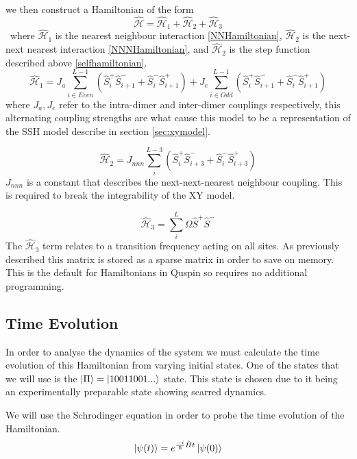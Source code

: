 we then construct a Hamiltonian of the form 
\begin{equation}
\hat{\mathcal{H}} = \hat{\mathcal{H}}_{1} + \hat{\mathcal{H}}_{2} +\hat{\mathcal{H}}_3
\end{equation}\
where $\hat{\mathcal{H}}_{1}$ is the nearest neighbour interaction \ref{NNHamiltonian}, $\hat{\mathcal{H}}_{2}$ is the next-next nearest interaction \ref{NNNHamiltonian}, and $\hat{\mathcal{H}}_{2}$ is the step function described above \ref{selfhamiltonian}.
\begin{equation} \label{NNHamiltonian}
\hat{\mathcal{H}}_1 = J_a \sum_{i\in Even}^{L-1} ( \hat{S}^+_i\hat{S}^-_{i+1} +\hat{S}^-_i\hat{S}^+_{i+1})  + J_e \sum_{i\in Odd}^{L -1} (\hat{S}^+_i\hat{S}^-_{i+1} +\hat{S}^-_i\hat{S}^+_{i+1})
\end{equation}
where $J_a, J_e$ refer to the intra-dimer and inter-dimer couplings respectively, this alternating coupling strengths are what cause this model to be a representation of the SSH model describe in section \ref{sec:xymodel}.

\begin{equation} \label{NNNHamiltonian}
\hat{\mathcal{H}}_2 = J_{nnn} \sum_{i}^{L-3} ( \hat{S}^+_i\hat{S}^-_{i+3} +\hat{S}^-_i\hat{S}^+_{i+3})
\end{equation}
$ J_{nnn}$ is a constant that describes the next-next-nearest neighbour coupling. This is required to break the integrability of the XY model.

\begin{equation} \label{selfhamiltonian}
\hat{\mathcal{H}}_3 = \sum_i^L \Omega \hat{S}^+\hat{S}^-
\end{equation}
The $\hat{\mathcal{H}}_{3}$ term relates to a transition frequency acting on all sites. As previously described this matrix is stored as a sparse matrix in order to save on memory. This is the default for Hamiltonians in Quspin so requires no additional programming. 

\subsection{Time Evolution}
In order to analyse the dynamics of the system we must calculate the time evolution of this Hamiltonian from varying initial states. One of the states that we will use is the $\ket{\Pi}=\ket{10011001...}$ state. This state is chosen due to it being an experimentally preparable state showing scarred dynamics. 

We will use the Schrodinger equation in order to probe the time evolution of the Hamiltonian. 
\begin{equation}
\label{eq:Schrodinger}
\ket{\psi(t)} = e^{\frac{-i}{\hbar} \hat{H}t}\ket{\psi(0)}
\end{equation}


